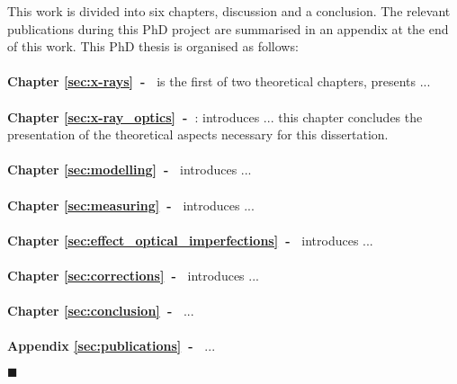 This work is divided into six chapters, discussion and a conclusion. The relevant publications during this PhD project are summarised in an appendix at the end of this work. This PhD thesis is organised as follows:
\\
\\
\textbf{Chapter \ref{sec:x-rays}~-~} is the first of two theoretical chapters, presents ...
\\
\\
\textbf{Chapter \ref{sec:x-ray_optics}~-~}: introduces ... this chapter concludes the presentation of the theoretical aspects necessary for this dissertation.
\\
\\
\textbf{Chapter \ref{sec:modelling}~-~} introduces ...
\\
\\
\textbf{Chapter \ref{sec:measuring}~-~} introduces ...
\\
\\
\textbf{Chapter \ref{sec:effect_optical_imperfections}~-~} introduces ...
\\
\\
\textbf{Chapter \ref{sec:corrections}~-~} introduces ...
\\
\\
\textbf{Chapter \ref{sec:conclusion}~-~}  ...
\\
\\
\textbf{Appendix \ref{sec:publications}~-~}  ...

$\blacksquare$